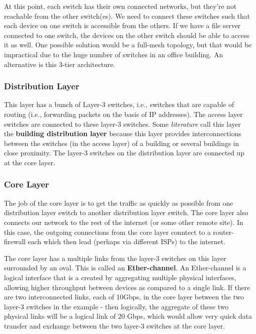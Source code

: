At this point, each switch has their own connected networks, but they're not reachable from the other switch(es). We need to connect these switches such that each device on one switch is accessible from the others. If we have a file server connected to one switch, the devices on the other switch should be able to access it as well. One possible solution would be a full-mesh topology, but that would be impractical due to the huge number of switches in an office building. An alternative is this 3-tier architecture. 

\subsubsection{Distribution Layer}
\vspace{-10pt}
This layer has a bunch of Layer-3 switches, i.e., switches that are capable of routing (i.e., forwarding packets on the basis of IP addresses). The access layer switches are connected to these layer-3 switches. Some \textit{literature} call this layer the \textbf{building distribution layer} because this layer provides interconnections between the switches (in the access layer) of a building or several buildings in close proximity. The layer-3 switches on the distribution layer are connected up at the core layer. 
\vspace{-10pt}

\subsubsection{Core Layer}
\vspace{-10pt}
The job of the core layer is to get the traffic as quickly as possible from one distribution layer switch to another distribution layer switch. The core layer also connects our network to the rest of the internet (or some other remote site). In this case, the outgoing connections from the core layer conntect to a router-firewall each which then lead (perhaps via different ISPs) to the internet. 

The core layer has a multiple links from the layer-3 switches on this layer surrounded by an oval. This is called an \textbf{Ether-channel}. An Ether-channel is a logical interface that is a created by aggregating multiple physical interfaces, allowing higher throughput between devices as compared to a single link. If there are two interconnected links, each of 10Gbps, in the core layer between the two layer-3 switches in the example - then logically, the aggregate of these two physical links will be a logical link of 20 Gbps, which would allow very quick data transfer and exchange between the two layer-3 switches at the core layer. 

